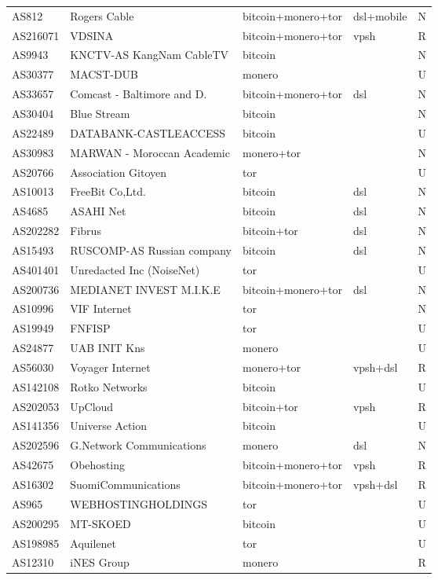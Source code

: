 \begin{longtable}{lllll}
AS812 & Rogers Cable & bitcoin+monero+tor & dsl+mobile & N \\ 
AS216071 & VDSINA & bitcoin+monero+tor & vpsh & R \\ 
AS9943 & KNCTV-AS KangNam CableTV & bitcoin &  & N \\ 
AS30377 & MACST-DUB & monero &  & U \\ 
AS33657 & Comcast - Baltimore and D. & bitcoin+monero+tor & dsl & N \\ 
AS30404 & Blue Stream & bitcoin &  & N \\ 
AS22489 & DATABANK-CASTLEACCESS & bitcoin &  & U \\ 
AS30983 & MARWAN - Moroccan Academic & monero+tor &  & N \\ 
AS20766 & Association Gitoyen & tor &  & U \\ 
AS10013 & FreeBit Co,Ltd. & bitcoin & dsl & N \\ 
AS4685 & ASAHI Net & bitcoin & dsl & N \\ 
AS202282 & Fibrus & bitcoin+tor & dsl & N \\ 
AS15493 & RUSCOMP-AS Russian company & bitcoin & dsl & N \\ 
AS401401 & Unredacted Inc (NoiseNet) & tor &  & U \\ 
AS200736 & MEDIANET INVEST M.I.K.E & bitcoin+monero+tor & dsl & N \\ 
AS10996 & VIF Internet & tor &  & N \\ 
AS19949 & FNFISP & tor &  & U \\ 
AS24877 & UAB INIT Kns & monero &  & U \\ 
AS56030 & Voyager Internet & monero+tor & vpsh+dsl & R \\ 
AS142108 & Rotko Networks & bitcoin &  & U \\ 
AS202053 & UpCloud & bitcoin+tor & vpsh & R \\ 
AS141356 & Universe Action & bitcoin &  & U \\ 
AS202596 & G.Network Communications & monero & dsl & N \\ 
AS42675 & Obehosting & bitcoin+monero+tor & vpsh & R \\ 
AS16302 & SuomiCommunications & bitcoin+monero+tor & vpsh+dsl & R \\ 
AS965 & WEBHOSTINGHOLDINGS & tor &  & U \\ 
AS200295 & MT-SKOED & bitcoin &  & U \\ 
AS198985 & Aquilenet & tor &  & U \\ 
AS12310 & iNES Group & monero &  & R \\ 

\end{longtable}

